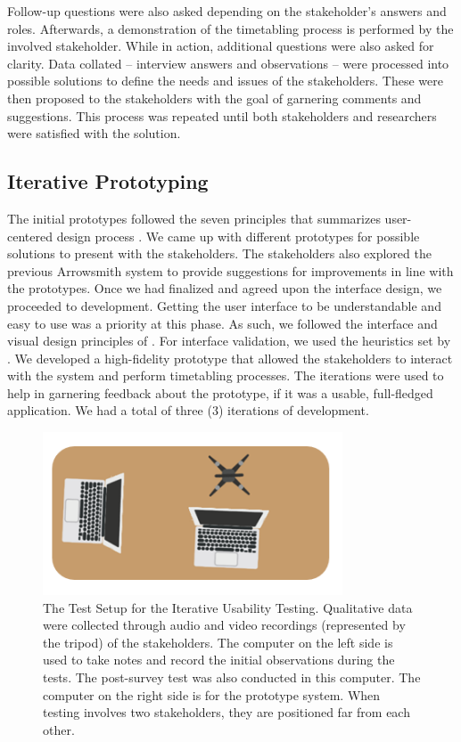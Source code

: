 Follow-up questions were also asked depending on the stakeholder's answers and roles. Afterwards, a demonstration of the timetabling process is performed by the involved stakeholder. While in action, additional questions were also asked for clarity. Data collated -- interview answers and observations -- were processed into possible solutions to define the needs and issues of the stakeholders. These were then proposed to the stakeholders with the goal of garnering comments and suggestions. This process was repeated until both stakeholders and researchers were satisfied with the solution.

\subsection{Iterative Prototyping}
The initial prototypes followed the seven principles that summarizes user-centered design process \cite{Norman:2002:DET:2187809}. We came up with different prototypes for possible solutions to present with the stakeholders. The stakeholders also explored the previous Arrowsmith system to provide suggestions for improvements in line with the prototypes. Once we had finalized and agreed upon the interface design, we proceeded to development. Getting the user interface to be understandable and easy to use was a priority at this phase. As such, we followed the interface and visual design principles of \cite{Soper2016, Gong2009, Thimbleby}. For interface validation, we used the heuristics set by \cite{Paz}. We developed a high-fidelity prototype that allowed the stakeholders to interact with the system and perform timetabling processes. The iterations were used to help in garnering feedback about the prototype, if it was a usable, full-fledged application. We had a total of three (3) iterations of development.

\begin{figure}[h]
   \centering
   \includegraphics[scale=1.0]{Diagrams/Test_Setup.PNG}
   \caption{The Test Setup for the Iterative Usability Testing. Qualitative data were collected through audio and video recordings (represented by the tripod) of the stakeholders. The computer on the left side is used to take notes and record the initial observations during the tests. The post-survey test was also conducted in this computer. The computer on the right side is for the prototype system. When testing involves two stakeholders, they are positioned far from each other.}
    \label{fig:pipelinediagram}
\end{figure}

